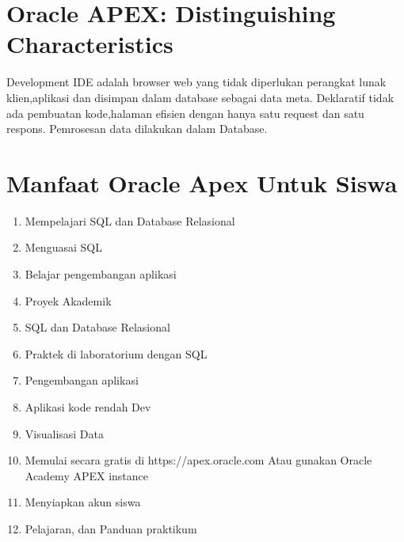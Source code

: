 \documentclass[a4paper,12pt]{report}
\begin{document}
\section{Oracle APEX: Distinguishing Characteristics}
\par Development IDE adalah browser web yang tidak diperlukan perangkat lunak klien,aplikasi dan disimpan dalam database sebagai data meta. Deklaratif tidak ada pembuatan kode,halaman efisien dengan hanya satu request dan satu respons. Pemrosesan data dilakukan dalam Database.

\section{Manfaat Oracle Apex Untuk Siswa}
\begin{enumerate}
\item Mempelajari SQL dan Database Relasional
\item Menguasai SQL
\item Belajar pengembangan aplikasi
\item Proyek Akademik
\item SQL dan Database Relasional
\item Praktek di laboratorium dengan SQL
\item Pengembangan aplikasi
\item Aplikasi kode rendah Dev
\item Visualisasi Data
\item Memulai secara gratis di https://apex.oracle.com Atau gunakan Oracle
Academy APEX instance
\item Menyiapkan akun siswa
\item Pelajaran, dan Panduan praktikum
\end{enumerate}
\end{document}
